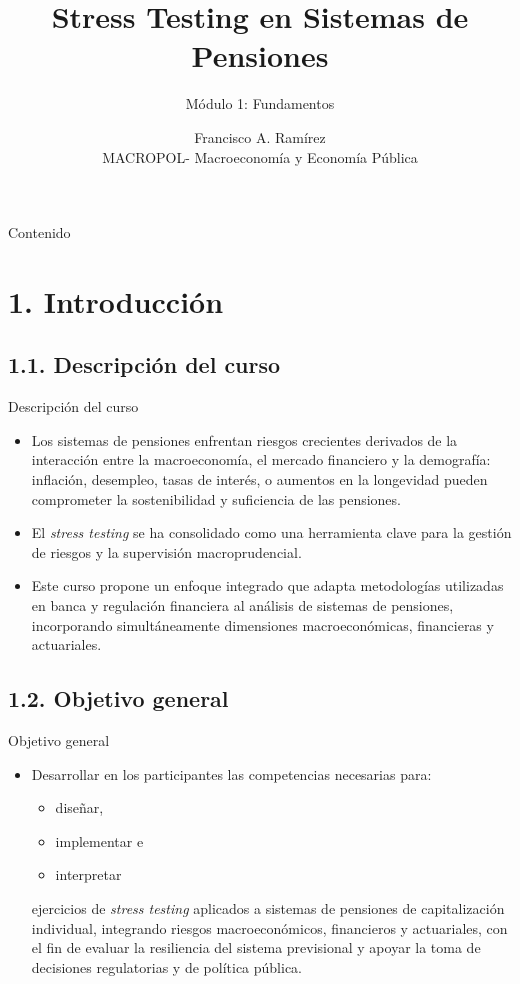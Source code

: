 \documentclass{beamer}
\title{Stress Testing en Sistemas de Pensiones}
\subtitle{Módulo 1: Fundamentos}
\author{Francisco A. Ramírez \\ 
MACROPOL- Macroeconomía y Economía Pública}
\date{}
\begin{document}
\frame{\titlepage}
\begin{frame}{Contenido}
\tableofcontents    
\end{frame}

\section{1. Introducción}
\subsection{1.1. Descripción del curso}
\begin{frame}[t]{Descripción del curso}

\begin{itemize}

    \item Los sistemas de pensiones enfrentan riesgos crecientes derivados de la interacción entre la macroeconomía, el mercado financiero y la demografía: inflación, desempleo, tasas de interés, o aumentos en la longevidad pueden comprometer la sostenibilidad y suficiencia de las pensiones.
\vspace{0.4cm} 
    \item El \textit{stress testing} se ha consolidado como una herramienta clave para la gestión de riesgos y la supervisión macroprudencial.
\vspace{0.4cm}
    \item Este curso propone un enfoque integrado que adapta metodologías utilizadas en banca y regulación financiera al análisis de sistemas de pensiones, incorporando simultáneamente dimensiones macroeconómicas, financieras y actuariales.

\end{itemize}

    
\end{frame}
\subsection{1.2. Objetivo general}
\begin{frame}[t]{Objetivo general}
\vspace{0.4cm}
    \begin{itemize}
    
        \item Desarrollar en los participantes las competencias necesarias para:
        
        \begin{itemize}
            \item diseñar, 
            \item implementar e
            \item interpretar
        \end{itemize} 
        ejercicios de \textit{stress testing} aplicados a sistemas de pensiones de capitalización individual, integrando riesgos macroeconómicos, financieros y actuariales, con el fin de evaluar la resiliencia del sistema previsional y apoyar la toma de decisiones regulatorias y de política pública.
    \end{itemize}
\end{frame}
\end{document}
